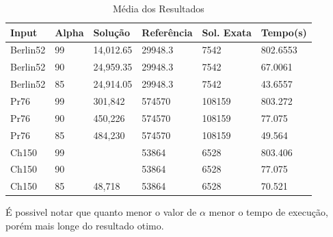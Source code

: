 \documentclass[a4paper, 12pt]{article}
\begin{document}
\begin{table}[h]
\label{tab:cpu}
\centering
\begin{tabular}{| l | l | l | l | l | l |}
\hline
\textbf{Input} & \textbf{Alpha} & \textbf{Solução} & \textbf{Referência} & \textbf{Sol. Exata} & \textbf{Tempo(s)} \\\hline
Berlin52 & 99 & 14,012.65 & 29948.3 & 7542   & 802.6553 \\\hline
Berlin52 & 90 & 24,959.35 & 29948.3 & 7542   & 67.0061  \\\hline
Berlin52 & 85 & 24,914.05 & 29948.3 & 7542   & 43.6557  \\\hline
Pr76     & 99 & 301,842   & 574570  & 108159 & 803.272  \\\hline
Pr76     & 90 & 450,226   & 574570  & 108159 & 77.075   \\\hline
Pr76     & 85 & 484,230   & 574570  & 108159 & 49.564   \\\hline
Ch150    & 99 &    & 53864   & 6528   & 803.406  \\\hline
Ch150    & 90 &    & 53864   & 6528   & 77.075   \\\hline
Ch150    & 85 & 48,718    & 53864   & 6528   & 70.521   \\\hline
\end{tabular}
\caption{ Média dos Resultados}
\end{table}


É possivel notar que quanto menor o valor de $\alpha$ menor o tempo de execução, porém mais longe do resultado otimo.

\newpage



\newpage
{}
\end{document}
